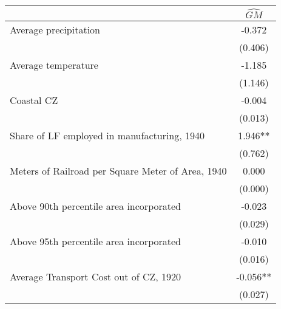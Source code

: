  \begin{tabular}{l*{1}{c}} \toprule
                &\multicolumn{1}{c}{$\widehat{GM}$}\\
\midrule
Average precipitation&   -0.372   \\
                &  (0.406)   \\
\addlinespace
Average temperature&   -1.185   \\
                &  (1.146)   \\
\addlinespace
Coastal CZ      &   -0.004   \\
                &  (0.013)   \\
\addlinespace
Share of LF employed in manufacturing, 1940&    1.946** \\
                &  (0.762)   \\
\addlinespace
Meters of Railroad per Square Meter of Area, 1940&    0.000   \\
                &  (0.000)   \\
\addlinespace
Above 90th percentile area incorporated&   -0.023   \\
                &  (0.029)   \\
\addlinespace
Above 95th percentile area incorporated&   -0.010   \\
                &  (0.016)   \\
\addlinespace
Average Transport Cost out of CZ, 1920&   -0.056** \\
                &  (0.027)   \\
 \bottomrule \end{tabular}
